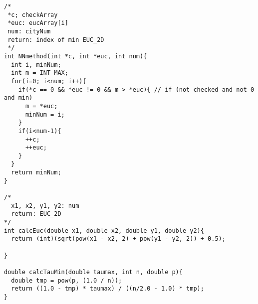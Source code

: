 \documentclass[a4j]{jarticle}
\begin{document}
\begin{lstlisting}[caption=MMAS.c, label=MMAS, xleftmargin=1cm]
/* 
 *c; checkArray
 *euc: eucArray[i]
 num: cityNum
 return: index of min EUC_2D
 */
int NNmethod(int *c, int *euc, int num){
  int i, minNum;
  int m = INT_MAX;
  for(i=0; i<num; i++){
    if(*c == 0 && *euc != 0 && m > *euc){ // if (not checked and not 0 and min)
      m = *euc;
      minNum = i;
    }
    if(i<num-1){
      ++c;
      ++euc;
    }
  }
  return minNum;
}

/*
  x1, x2, y1, y2: num
  return: EUC_2D
*/
int calcEuc(double x1, double x2, double y1, double y2){
  return (int)(sqrt(pow(x1 - x2, 2) + pow(y1 - y2, 2)) + 0.5);
   
}

double calcTauMin(double taumax, int n, double p){
  double tmp = pow(p, (1.0 / n));
  return ((1.0 - tmp) * taumax) / ((n/2.0 - 1.0) * tmp);
}
\end{lstlisting}
\end{document}
